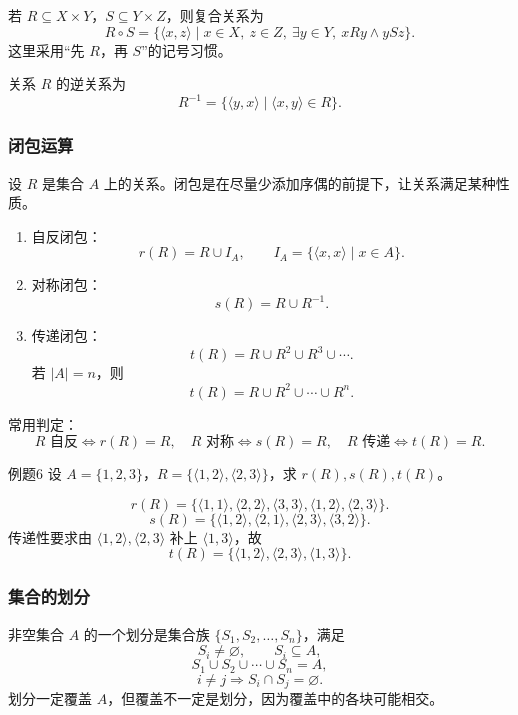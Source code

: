 若 \(R\subseteq X\times Y\)，\(S\subseteq Y\times Z\)，则复合关系为
\[
R\circ S=\{\langle x,z\rangle\mid x\in X,\ z\in Z,\ \exists y\in Y,\ xRy\land ySz\}.
\]
这里采用“先 \(R\)，再 \(S\)”的记号习惯。

关系 \(R\) 的逆关系为
\[
R^{-1}=\{\langle y,x\rangle\mid \langle x,y\rangle\in R\}.
\]

\subsubsection{闭包运算}

设 \(R\) 是集合 \(A\) 上的关系。闭包是在尽量少添加序偶的前提下，让关系满足某种性质。
\begin{enumerate}
	\item 自反闭包：
	\[
	r(R)=R\cup I_A,\qquad I_A=\{\langle x,x\rangle\mid x\in A\}.
	\]
	\item 对称闭包：
	\[
	s(R)=R\cup R^{-1}.
	\]
	\item 传递闭包：
	\[
	t(R)=R\cup R^2\cup R^3\cup\cdots.
	\]
	若 \(|A|=n\)，则
	\[
	t(R)=R\cup R^2\cup\cdots\cup R^n.
	\]
\end{enumerate}

常用判定：
\[
R\text{ 自反}\Leftrightarrow r(R)=R,\quad
R\text{ 对称}\Leftrightarrow s(R)=R,\quad
R\text{ 传递}\Leftrightarrow t(R)=R.
\]

\begin{question}{例题6}
	设 \(A=\{1,2,3\}\)，\(R=\{\langle1,2\rangle,\langle2,3\rangle\}\)，求 \(r(R),s(R),t(R)\)。
	
	\begin{solution}
	\[
	r(R)=\{\langle1,1\rangle,\langle2,2\rangle,\langle3,3\rangle,\langle1,2\rangle,\langle2,3\rangle\}.
	\]
	\[
	s(R)=\{\langle1,2\rangle,\langle2,1\rangle,\langle2,3\rangle,\langle3,2\rangle\}.
	\]
	传递性要求由 \(\langle1,2\rangle,\langle2,3\rangle\) 补上 \(\langle1,3\rangle\)，故
	\[
	t(R)=\{\langle1,2\rangle,\langle2,3\rangle,\langle1,3\rangle\}.
	\]
	\end{solution}
\end{question}

\subsubsection{集合的划分}

非空集合 \(A\) 的一个划分是集合族 \(\{S_1,S_2,\dots,S_n\}\)，满足
\[
S_i\ne\varnothing,\qquad S_i\subseteq A,
\]
\[
S_1\cup S_2\cup\cdots\cup S_n=A,
\]
\[
i\ne j\Rightarrow S_i\cap S_j=\varnothing.
\]
划分一定覆盖 \(A\)，但覆盖不一定是划分，因为覆盖中的各块可能相交。

